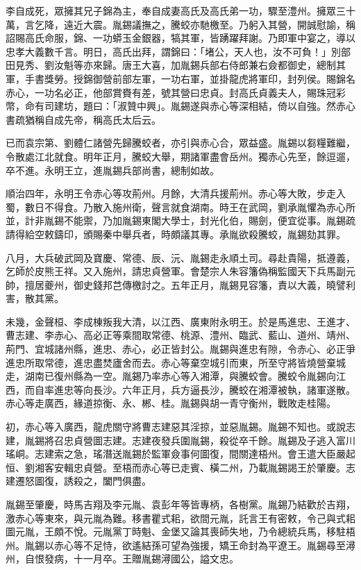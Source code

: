 \begin{pinyinscope}
李自成死，眾擁其兄子錦為主，奉自成妻高氏及高氏弟一功，驟至澧州。擁眾三十萬，言乞降，遠近大震。胤錫議撫之，騰蛟亦馳檄至。乃躬入其營，開誠慰諭，稱詔賜高氏命服，錦、一功蟒玉金銀器，犒其軍，皆踴躍拜謝。乃即軍中宴之，導以忠孝大義數千言。明日，高氏出拜，謂錦曰：「堵公，天人也，汝不可負！」別部田見秀、劉汝魁等亦來歸。唐王大喜，加胤錫兵部右侍郎兼右僉都御史，總制其軍，手書獎勞。授錦御營前部左軍，一功右軍，並掛龍虎將軍印，封列侯。賜錦名赤心，一功名必正，他部賞賚有差，號其營曰忠貞。封高氏貞義夫人，賜珠冠彩幣，命有司建坊，題曰：「淑贊中興」。胤錫遂與赤心等深相結，倚以自強。然赤心書疏猶稱自成先帝，稱高氏太后云。

已而袁宗第、劉體仁諸營先歸騰蛟者，亦引與赤心合，眾益盛。胤錫以芻糧難繼，令散處江北就食。明年正月，騰蛟大舉，期諸軍盡會岳州。獨赤心先至，餘逗遛，卒不進。永明王立，進胤錫兵部尚書，總制如故。

順治四年，永明王令赤心等攻荊州。月餘，大清兵援荊州。赤心等大敗，步走入蜀，數日不得食。乃散入施州衛，聲言就食湖南。時王在武岡，劉承胤懼為赤心所並，計非胤錫不能禦，乃加胤錫東閣大學士，封光化伯，賜劍，便宜從事。胤錫疏請得給空敕鑄印，頒賜秦中舉兵者，時頗議其專。承胤欲殺騰蛟，胤錫劾其罪。

八月，大兵破武岡及寶慶、常德、辰、沅、胤錫走永順土司。尋赴貴陽，抵遵義，乞師於皮熊王祥。又入施州，請忠貞營軍。會楚宗人朱容籓偽稱監國天下兵馬副元帥，擅居夔州，御史錢邦芑傳檄討之。五年正月，胤錫見容籓，責以大義，曉譬利害，散其黨。

未幾，金聲桓、李成棟叛我大清，以江西、廣東附永明王。於是馬進忠、王進才、曹志建、李赤心、高必正等乘間取常德、桃源、澧州、臨武、藍山、道州、靖州、荊門、宜城諸州縣，進忠、赤心，必正皆封公。胤錫與進忠有隙，令赤心、必正爭進忠所取常德，進忠盡焚廬舍而去。赤心等棄空城引而東，所至守將皆燒營棄城走，湖南已復州縣為一空。胤錫乃率赤心等入湘潭，與騰蛟會。騰蛟令胤錫向江西，而自率進忠等向長沙。六年正月，兵方逼長沙，騰蛟在湘潭被執，諸軍遂散。赤心等走廣西，緣道掠衡、永、郴、桂。胤錫與胡一青守衡州，戰敗走桂陽。

初，赤心等入廣西，龍虎關守將曹志建惡其淫掠，並惡胤錫。胤錫不知也。或說志建，胤錫將召忠貞營圖志建。志建夜發兵圍胤錫，殺從卒千餘。胤錫及子逃入富川瑤峒。志建索之急，瑤潛送胤錫於監軍僉事何圖復，間關達梧州。會王遣大臣嚴起恒、劉湘客安輯忠貞營。至梧而赤心等已走賓、橫二州，乃載胤錫謁王於肇慶。志建遷怒圖復，誘殺之，闔門俱盡。

胤錫至肇慶，時馬吉翔及李元胤、袁彭年等皆專柄，各樹黨。胤錫乃結歡於吉翔，激赤心等東來，與元胤為難。移書瞿式耜，欲間元胤，託言王有密敕，令己與式耜圖元胤，王頗不悅。元胤黨丁時魁、金堡又論其喪師失地，乃令總統兵馬，移駐梧州。胤錫以赤心等不足恃，欲遙結孫可望為強援，矯王命封為平遼王。胤錫尋至潯州，自恨發病，十一月卒。王贈胤錫潯國公，謚文忠。


\end{pinyinscope}
